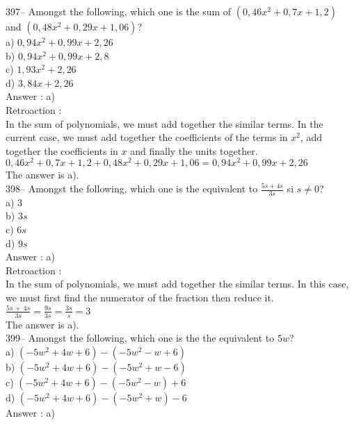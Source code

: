 ﻿\documentclass[letterpaper, 12pt]{article}
\begin{document}
397-- Amongst the following, which one is the sum of
$(0,46x^{2}+0,7x+1,2)$ and $(0,48x^{2}+0,29x+1,06)$?\\
a) $0,94x^{2}+0,99x+2,26$ \\
b) $0,94x^{2}+0,99x+2,8$ \\
c) $1,93x^{2}+2,26$\\
d) $3,84x+2,26$\\

Answer : a) \\

Retroaction : \\
In the sum of polynomials, we must add together the similar terms. In the current case, we must add together the coefficients of the terms in $x^{2}$, add together the coefficients in $x$ and finally the units together.\\
$0,46x^{2}+0,7x+1,2+0,48x^{2}+0,29x+1,06=0,94x^{2}+0,99x+2,26$\\
The answer is a).\\

398-- Amongst the following, which one is the equivalent to
$\frac{5s+4s}{3s}$ si $s\neq0$?\\
a) 3\\
b) $3s$\\
c) $6s$\\
d) $9s$\\

Answer : a)\\

Retroaction : \\
In the sum of polynomials, we must add together the similar terms. In this case, we must first find the numerator of the fraction then reduce it.\\[2mm]
$\frac{5s\,+\,4s}{3s}=\frac{9s}{3s}=\frac{3s}{s}=3$\\[2mm]
The answer is a).\\

399-- Amongst the following, which one is the the equivalent to $5w$?\\
a) $\left( -5w^{2}+4w+6\right) -\left( -5w^{2}-w+6\right) $\\
b) $\left( -5w^{2}+4w+6\right) -\left( -5w^{2}+w-6\right) $\\
c) $\left( -5w^{2}+4w+6\right) -\left( -5w^{2}-w\right) +6 $\\
d) $\left( -5w^{2}+4w+6\right) -\left( -5w^{2}+w\right) -6$\\

Answer : a)\\
\end{document}
